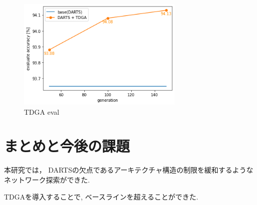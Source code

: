 \documentclass[a4paper,twoside,twocolumn,10pt]{article}
\begin{document}
\begin{figure}[t]
  \centering
  \includegraphics[width=80mm]{eval_tdga.png}
  \caption{TDGA eval}
  \label{fig:eval_tdga}
\end{figure}

%

\section{まとめと今後の課題}
本研究では，
%
DARTSの欠点であるアーキテクチャ構造の制限を緩和するようなネットワーク探索ができた.


TDGAを導入することで, ベースラインを超えることができた.





\end{document}
